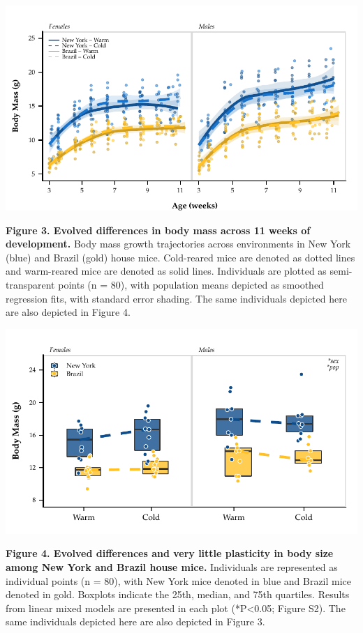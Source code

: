 \documentclass[]{article}
\begin{document}
\newpage

\includegraphics{../results/figures/Weekly_BW.pdf}

\textbf{Figure 3. Evolved differences in body mass across 11 weeks of
development.} Body mass growth trajectories across environments in New
York (blue) and Brazil (gold) house mice. Cold-reared mice are denoted
as dotted lines and warm-reared mice are denoted as solid lines.
Individuals are plotted as semi-transparent points (n = 80), with
population means depicted as smoothed regression fits, with standard
error shading. The same individuals depicted here are also depicted in
Figure 4.

\newpage

\includegraphics{../results/figures/RXNs_BW.pdf}

\textbf{Figure 4. Evolved differences and very little plasticity in body
size among New York and Brazil house mice.} Individuals are represented
as individual points (n = 80), with New York mice denoted in blue and
Brazil mice denoted in gold. Boxplots indicate the 25th, median, and
75th quartiles. Results from linear mixed models are presented in each
plot (*P\textless{}0.05; Figure S2). The same individuals depicted here
are also depicted in Figure 3.
\end{document}
